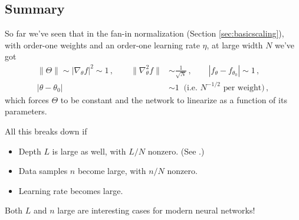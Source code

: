 \documentclass[11pt]{article}
\begin{document}
\subsection{Summary}

So far we've seen that in the fan-in normalization (Section \ref{sec:basicscaling}), with order-one weights and an order-one learning rate $\eta$, at large width $N$ we've got
%
\begin{equation}
    \begin{aligned}
    \|\Theta\|\sim |\nabla_\theta f|^2 \sim 1\,,\qquad \|\nabla_\theta^2 f\|&\sim \frac{1}{\sqrt N}\,,\qquad |f_\theta-f_{\theta_0}|\sim 1\,, \\
    |\theta-\theta_0|&\sim 1 \;\;\text{(i.e. } N^{-1/2}\text{ per weight)}\,,
    \end{aligned}
\end{equation}
%
which forces $\Theta$ to be constant and the network to linearize as a function of its parameters.

All this breaks down if
\begin{itemize}
    \item Depth $L$ is large as well, with $L/N$ nonzero. (See \cite[Ch. 11]{roberts2022principles}.)
    \item Data samples $n$ become large, with $n/N$ nonzero.
    \item Learning rate becomes large.
\end{itemize}
%
Both $L$ and $n$ large are interesting cases for modern neural networks!
\end{document}
